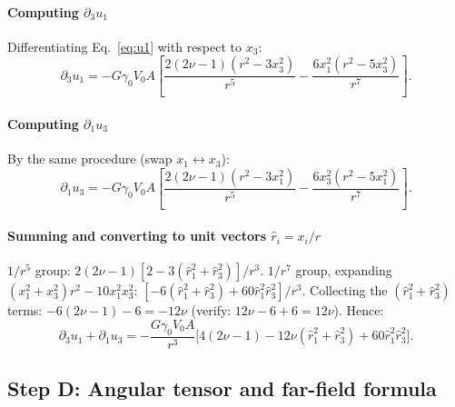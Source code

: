 \documentclass[3p]{elsarticle}
\newcommand{\gz}{\gamma_0}
\begin{document}
\paragraph{Computing $\partial_3u_1$}
Differentiating Eq.~\eqref{eq:u1} with respect to $x_3$:
\begin{equation}
  \partial_3u_1=-G\gz V_0 A\left[\frac{2(2\nu-1)(r^2-3x_3^2)}{r^5}
    -\frac{6x_1^2(r^2-5x_3^2)}{r^7}\right].
    \label{eq:du1dx3}
\end{equation}

\paragraph{Computing $\partial_1u_3$}
By the same procedure (swap $x_1\leftrightarrow x_3$):
\begin{equation}
  \partial_1u_3=-G\gz V_0 A\left[\frac{2(2\nu-1)(r^2-3x_1^2)}{r^5}
    -\frac{6x_3^2(r^2-5x_1^2)}{r^7}\right].
    \label{eq:du3dx1}
\end{equation}

\paragraph{Summing and converting to unit vectors $\hat r_i=x_i/r$}
$1/r^5$ group:
$2(2\nu-1)[2-3(\hat r_1^2+\hat r_3^2)]/r^3$.
$1/r^7$ group, expanding $(x_1^2+x_3^2)r^2-10x_1^2x_3^2$:
$[-6(\hat r_1^2+\hat r_3^2)+60\hat r_1^2\hat r_3^2]/r^3$.
Collecting the $(\hat r_1^2+\hat r_3^2)$ terms:
$-6(2\nu-1)-6=-12\nu$ (verify: $12\nu-6+6=12\nu$). Hence:
\begin{equation}
  \partial_3u_1+\partial_1u_3=
  -\frac{G\gz V_0 A}{r^3}
  \bigl[4(2\nu-1)-12\nu(\hat r_1^2+\hat r_3^2)
  +60\hat r_1^2\hat r_3^2\bigr].
  \label{eq:gradsum}
\end{equation}

\subsection{Step D: Angular tensor and far-field formula}
\label{sec:stepD}
\end{document}

